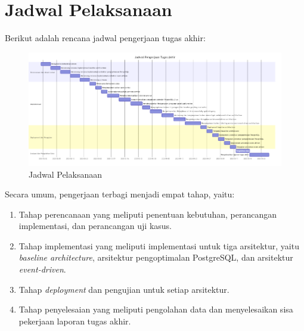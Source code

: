 \section{Jadwal Pelaksanaan}

Berikut adalah rencana jadwal pengerjaan tugas akhir:

\begin{figure}[ht]
    \centering
    \includegraphics[width=1\textwidth]{resources/schedule/schedule.png}
    \caption{Jadwal Pelaksanaan}
    \label{fig:jadwal pelaksanaan}
\end{figure}

Secara umum, pengerjaan terbagi menjadi empat tahap, yaitu:

\begin{enumerate}
    \item Tahap perencanaan yang meliputi penentuan kebutuhan, perancangan implementasi, dan perancangan uji kasus.
    \item Tahap implementasi yang meliputi implementasi untuk tiga arsitektur, yaitu \textit{baseline architecture}, arsitektur pengoptimalan PostgreSQL, dan arsitektur \textit{event-driven}.
    \item Tahap \textit{deployment} dan pengujian untuk setiap arsitektur.
    \item Tahap penyelesaian yang meliputi pengolahan data dan menyelesaikan sisa pekerjaan laporan tugas akhir.
\end{enumerate}
